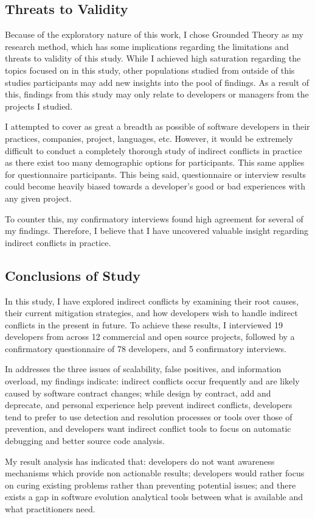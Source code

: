 \subsection{Threats to Validity}
Because of the exploratory nature of this work, I chose Grounded Theory as my research method, which has some implications regarding the
limitations and threats to validity of this study. While I achieved high saturation regarding the topics focused on in this study, other
populations studied from outside of this studies participants may add new insights into the pool of findings. As a result of this, findings
from this study may only relate to developers or managers from the projects I studied.

I attempted to cover as great a breadth as possible of software developers in their practices, companies,
project, languages, etc. However, it would be extremely difficult to conduct a completely thorough study of indirect conflicts in practice
as there exist too many demographic options for participants. This same applies for questionnaire participants. This being said, questionnaire 
or interview results could become heavily biased towards a developer's good or bad experiences with any given project.

To counter this, my confirmatory interviews found high agreement for several of my findings. Therefore, I believe that
I have uncovered valuable insight regarding indirect conflicts in practice.

\subsection{Conclusions of Study}

In this study, I have explored indirect conflicts by examining their root causes, their current mitigation strategies, and how developers
wish to handle indirect conflicts in the present in future. To achieve these results, I interviewed 19 developers from across 12 commercial 
and open source projects, followed by a confirmatory questionnaire of 78 developers, and 5 confirmatory interviews.

In addresses the three issues of scalability, false positives, and information overload, my findings indicate:
indirect conflicts occur frequently and are likely caused by software contract changes;
while design by contract, add and deprecate, and personal experience help prevent indirect conflicts,
developers tend to prefer to use detection and resolution processes or tools
over those of prevention, and developers want indirect conflict tools to focus on automatic debugging and better source code analysis.

My result analysis has indicated that: developers do not want awareness mechanisms which provide non actionable results; developers
would rather focus on curing existing problems rather than preventing potential issues;
and there exists a gap in software evolution analytical tools between what is available and what practitioners need.
